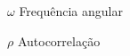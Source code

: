
\begin{simbolos} \itemsep -1pt
	\item[$ \omega $] Frequência angular
	\item[$ \rho $] Autocorrelação
\end{simbolos}
